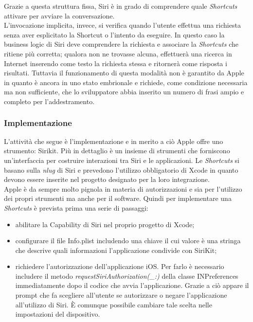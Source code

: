 		Grazie a questa struttura fissa, Siri è in grado di comprendere quale \emph{Shortcuts} attivare per avviare la conversazione. \\
		L'invocazione implicita, invece, si verifica quando l'utente effettua una richiesta senza aver esplicitato la Shortcut o l'intento da eseguire. In questo caso la business logic di Siri deve comprendere la richiesta e associare la \emph{Shortcuts} che ritiene più corretta; qualora non ne trovasse alcuna, effettuerà una ricerca in Internet inserendo come testo la richiesta stessa e ritornerà come risposta i risultati. Tuttavia il funzionamento di questa modalità non è garantito da Apple in quanto è ancora in uno stato embrionale e richiede, come condizione necessaria ma non sufficiente, che lo sviluppatore abbia inserito un numero di frasi ampio e completo per l'addestramento.
		\subsubsection{Implementazione}
		L'attività che segue è l'implementazione e in merito a ciò Apple offre uno strumento: Sirikit. Più in dettaglio è un insieme di strumenti che forniscono un'interfaccia per costruire interazioni tra Siri e le applicazioni. Le \emph{Shortcuts} si basano sulla \emph{\gls{nlug}} di Siri e prevedono l'utilizzo obbligatorio di Xcode in quanto devono essere inserite nel progetto designato per la loro integrazione. \\
		Apple è da sempre molto pignola in materia di autorizzazioni e sia per  l'utilizzo dei propri strumenti ma anche per il software. Quindi per implementare una \emph{Shortcuts} è prevista prima una serie di passaggi:
		\begin{itemize}
			\item abilitare la Capability di Siri nel proprio progetto di Xcode;
			\item configurare il file Info.plist includendo una chiave il cui valore è una stringa che descrive quali informazioni l'applicazione condivide con SiriKit;
			\item richiedere l’autorizzazione dell’applicazione iOS. Per farlo è necessario includere il metodo \emph{requestSiriAuthorization(\_:)} della classe INPreferences immediatamente dopo il codice che avvia l’applicazione. Grazie a ciò appare il prompt che fa scegliere all’utente se autorizzare o negare l’applicazione all’utilizzo di Siri. È comunque possibile cambiare tale scelta nelle impostazioni del dispositivo.
		\end{itemize}
